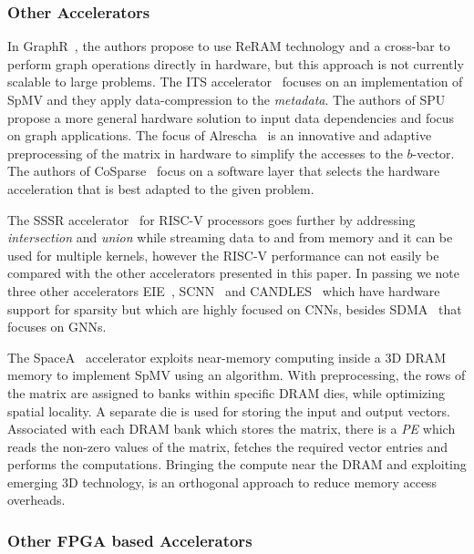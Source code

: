 \subsubsection{Other Accelerators}

In GraphR~\cite{Song2018_GraphR}, the authors propose to use ReRAM technology and a cross-bar to perform graph operations directly in hardware, but this approach is not currently scalable to large problems. The ITS accelerator~\cite{Sadi2019_ITS} focuses on an  implementation of SpMV and they apply data-compression to the \emph{metadata}. The authors of SPU~\cite{Dadu2019_SPU} propose a more general hardware solution to input data dependencies and focus on graph applications. The focus of Alrescha~\cite{Asgari2020_Alrescha} is an innovative and adaptive preprocessing of the matrix in hardware to simplify the accesses to the $b$-vector. The authors of CoSparse~\cite{Feng2021_CoSPARSE} focus on a software layer that selects the hardware acceleration that is best adapted to the given problem.

The SSSR accelerator~\cite{Scheffler2023_SSSR} for RISC-V processors goes further by addressing \emph{intersection} and \emph{union} while streaming data to and from memory and it can be used for multiple kernels, however the RISC-V performance can not easily be compared with the other accelerators presented in this paper. In passing we note three other accelerators EIE~\cite{Han2016_EIE}, SCNN~\cite{Angshuman2017_SCNN} and CANDLES~\cite{Gudaparthi2022_CANDLES} which have hardware support for sparsity but which are highly focused on CNNs, besides SDMA~\cite{Gao2023_SDMA} that focuses on GNNs.

The SpaceA~\cite{Xie2021_SpaceA} accelerator exploits near-memory computing inside a 3D DRAM memory to implement SpMV using an  algorithm. With preprocessing, the rows of the matrix are assigned to banks within specific DRAM dies, while optimizing spatial locality. A separate die is used for storing the input and output vectors. Associated with each DRAM bank which stores the matrix, there is a \emph{PE} which reads the non-zero values of the matrix, fetches the required vector entries and performs the computations. Bringing the compute near the DRAM and exploiting emerging 3D technology, is an orthogonal approach to reduce memory access overheads.

\subsubsection{Other FPGA based Accelerators}

